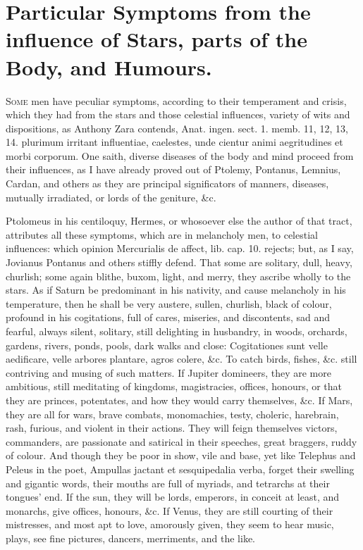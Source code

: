 {%
\section[Symptoms from the influence of Stars]{Particular Symptoms from the influence of Stars, parts of the Body, and Humours.}

\lettrine{S}{ome} men have peculiar symptoms, according to their temperament and
crisis, which they had from the stars and those celestial influences,
variety of wits and dispositions, as Anthony Zara contends, Anat.
ingen. sect. 1. memb. 11, 12, 13, 14. plurimum irritant influentiae,
caelestes, unde cientur animi aegritudines et morbi corporum. One
saith, diverse diseases of the body and mind proceed from their
influences, as I have already proved out of Ptolemy, Pontanus,
Lemnius, Cardan, and others as they are principal significators of
manners, diseases, mutually irradiated, or lords of the geniture, \&c.

Ptolomeus in his centiloquy, Hermes, or whosoever else the author of
that tract, attributes all these symptoms, which are in melancholy men,
to celestial influences: which opinion Mercurialis de affect, lib. cap.
10. rejects; but, as I say, Jovianus Pontanus and others stiffly
defend. That some are solitary, dull, heavy, churlish; some again
blithe, buxom, light, and merry, they ascribe wholly to the stars. As
if Saturn be predominant in his nativity, and cause melancholy in his
temperature, then he shall be very austere, sullen, churlish,
black of colour, profound in his cogitations, full of cares, miseries,
and discontents, sad and fearful, always silent, solitary, still
delighting in husbandry, in woods, orchards, gardens, rivers, ponds,
pools, dark walks and close: Cogitationes sunt velle aedificare, velle
arbores plantare, agros colere, \&c. To catch birds, fishes, \&c. still
contriving and musing of such matters. If Jupiter domineers, they are
more ambitious, still meditating of kingdoms, magistracies, offices,
honours, or that they are princes, potentates, and how they would carry
themselves, \&c. If Mars, they are all for wars, brave combats,
monomachies, testy, choleric, harebrain, rash, furious, and violent in
their actions. They will feign themselves victors, commanders, are
passionate and satirical in their speeches, great braggers, ruddy of
colour. And though they be poor in show, vile and base, yet like
Telephus and Peleus in the poet, Ampullas jactant et
sesquipedalia verba, forget their swelling and gigantic words, their
mouths are full of myriads, and tetrarchs at their tongues' end. If the
sun, they will be lords, emperors, in conceit at least, and monarchs,
give offices, honours, \&c. If Venus, they are still courting of their
mistresses, and most apt to love, amorously given, they seem to hear
music, plays, see fine pictures, dancers, merriments, and the like.

}
